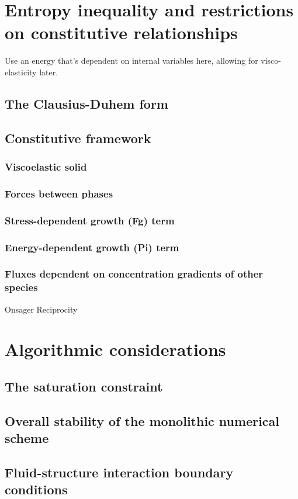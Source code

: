 \section{Entropy inequality and restrictions on constitutive
  relationships}
\label{eu-entropy-inequality}
Use an energy that's dependent on internal variables here, allowing for visco-elasticity later.
\subsection{The Clausius-Duhem form}
\subsection{Constitutive framework}
\subsubsection{Viscoelastic solid}
\subsubsection{Forces between phases}
\subsubsection{Stress-dependent growth (Fg) term}
\label{eu-stress-dependent-source}
\subsubsection{Energy-dependent growth (Pi) term}
\subsubsection{Fluxes dependent on concentration gradients of other
  species}
Onsager Reciprocity
\section{Algorithmic considerations}
\label{eu-algorithmic-considerations}
\subsection{The saturation constraint}
\subsection{Overall stability of the monolithic numerical scheme}
\subsection{Fluid-structure interaction boundary conditions}


%

